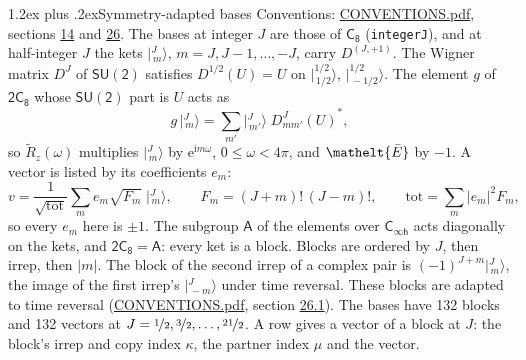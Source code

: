 \documentclass[10pt,a4paper]{article}
\makeatletter
\renewcommand\section{\@startsection{section}{1}{\z@}{-3ex plus -1ex minus -.2ex}%
  {1.2ex plus .2ex}{\normalfont\large\sffamily\bfseries\color{parttitle}}}
\numberwithin{equation}{section}
\newcommand{\eltfont}[1]{{\let\sigma\eltsigma\mathelt{#1}}}
\newcommand{\grp}[1]{\mathsf{#1}}
\newcommand{\elt}[1]{\eltfont{#1}}
\newcommand{\iunit}{\mathrm{i}}
\newcommand{\expe}{\mathrm{e}}
\newcommand{\irrJp}[2]{D^{(#1,#2)}}
\newcommand{\wignerD}[1]{D^{#1}}
\newcommand{\conj}[1]{{#1}^{*}}
\newcommand{\mult}{\kappa}
\newcommand{\intx}{\mu}
\newcommand{\jm}[2]{\bigl\lvert{}^{#1}_{\,#2}\bigr\rangle}
\newcommand{\barred}[1]{\bar{#1}}
\newcommand{\lift}[1]{\tilde{#1}}
\makeatother
\begin{document}
\section{Symmetry-adapted bases}\label{s:bases}
Conventions: \href{../../CONVENTIONS.pdf}{CONVENTIONS.pdf}, sections \href{../../../rotation/CONVENTIONS.pdf\#conv.14}{14} and \href{../../CONVENTIONS.pdf\#conv.26}{26}.
\leavevmode\label{n:index.m}\label{n:vector.ket}The bases at integer $J$ are those of \href{../../../rotation/data/pdf/C8.pdf}{$\grp{C_{8}}$} (\texttt{integerJ}), and at half-integer $J$ the kets $\jm{J}{m}$, $m = J, J-1, \dots, -J$, carry $\irrJp{J}{+1}$. \label{n:matrix.wigner}The Wigner matrix $\wignerD{J}$ of $\grp{SU(2)}$ satisfies $\wignerD{1/2}(U) = U$ on $\jm{1/2}{1/2}$, $\jm{1/2}{-1/2}$. The element $g$ of $\grp{2C_{8}}$ whose $\grp{SU(2)}$ part is $U$ acts as
\begin{equation}\label{e:action}g\,\jm{J}{m} = \sum_{m'} \jm{J}{m'}\; \conj{\wignerD{J}_{m m'}(U)},\end{equation}
so $\lift{R}_{z}(\omega)$ multiplies $\jm{J}{m}$ by $\expe^{\iunit m\omega}$, $0 \le \omega < 4\pi$, and $\elt{\barred{E}}$ by $-1$. \label{n:index.ketcoefficient}\label{n:vector.basis.symmetry}\label{n:index.ketweight}\label{n:index.total}A vector is listed by its coefficients $e_m$:
\begin{equation}\label{e:ket}v = \frac{1}{\sqrt{\mathrm{tot}}}\sum_m e_m\sqrt{F_m}\;\jm{J}{m},\qquad F_m = (J+m)!\,(J-m)!,\qquad \mathrm{tot} = \sum_m |e_m|^2F_m,\end{equation}
so every $e_m$ here is $\pm 1$.
\leavevmode\label{n:group.A}The subgroup $\grp{A}$ of the elements over $\grp{C_{\infty h}}$ acts diagonally on the kets, and $\grp{2C_{8}} = \grp{A}$: every ket is a block. Blocks are ordered by $J$, then irrep, then $|m|$. The block of the second irrep of a complex pair is $(-1)^{J+m}\jm{J}{m}$, the image of the first irrep's $\jm{J}{-m}$ under time reversal. These blocks are adapted to time reversal (\href{../../CONVENTIONS.pdf}{CONVENTIONS.pdf}, section \href{../../CONVENTIONS.pdf\#conv.26.1}{26.1}).
The bases have 132 blocks and 132 vectors at $J = \nicefrac{1}{2}, \nicefrac{3}{2}, \dots, \nicefrac{21}{2}$. \label{n:index.copy}\label{n:head.vector}A row gives a vector of a block at $J$: the block's irrep and copy index $\mult$, the partner index $\intx$ and the vector.
\end{document}
